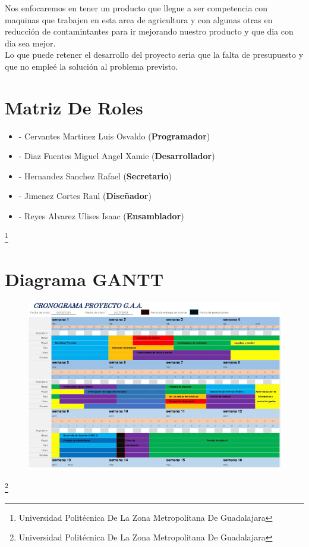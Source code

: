 \documentclass[11pt,a4paper]{article}
\begin{document}
Nos enfocaremos en tener un producto que llegue a ser competencia con maquinas que trabajen en esta area de agricultura y con algunas otras en reducción de contamintantes para ir mejorando nuestro producto y que dia con dia sea mejor.\\

Lo que puede retener el desarrollo del proyecto seria que la falta de presupuesto y que no empleé la solución al problema previsto.
 

 \section{Matriz De Roles}
 
 \begin{itemize}
 \item - Cervantes Martinez Luis Osvaldo (\textbf{Programador})
  \item - Diaz Fuentes Miguel Angel Xamie (\textbf{Desarrollador})
   \item - Hernandez Sanchez Rafael (\textbf{Secretario})
   \item - Jimenez Cortes Raul (\textbf{Diseñador})
 \item - Reyes Alvarez Ulises Isaac (\textbf{Ensamblador})
 \end{itemize}
 
 
 \footnote{Universidad Politécnica De La Zona Metropolitana De Guadalajara} 
\newpage

 \section{Diagrama GANTT}
 \begin{figure}[hbtp]
 \centering
  \includegraphics[scale=0.9]{Pictures/Diagrama(01).png} 
 \end{figure}
  \footnote{Universidad Politécnica De La Zona Metropolitana De Guadalajara} 
\newpage
\end{document}
